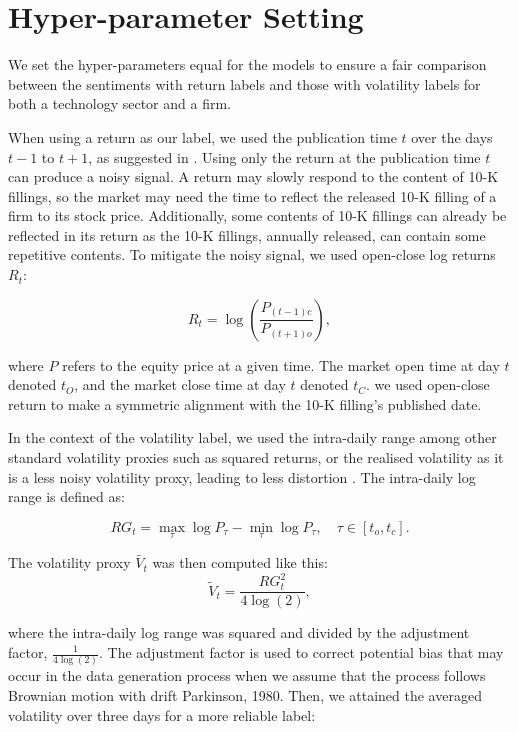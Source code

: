 \documentclass[logo,bsc,singlespacing,parskip]{infthesis}
\begin{document}
\section{Hyper-parameter Setting}
\label{sec:hyperparameter}
We set the hyper-parameters equal for the models to ensure a fair comparison between the sentiments with return labels and those with volatility labels for both a technology sector and a firm.

When using a return as our label, we used the publication time $t$ over the days $t - 1$ to $t +1$, as suggested in \cite{ke2020predicting}. Using only the return at the publication time $t$ can produce a noisy signal. A return may slowly respond to the content of 10-K fillings, so the market may need the time to reflect the released 10-K filling of a firm to its stock price. Additionally, some contents of 10-K fillings can already be reflected in its return as the 10-K fillings, annually released, can contain some repetitive contents. To mitigate the noisy signal, we used open-close log returns
$R_t$:

\begin{equation} \label{5.1}
R_t = \log\left(\frac{P_{(t-1)c}}{P_{(t+1)o}}\right),
\end{equation}

where $P$ refers to the equity price at a given time. The market open time at day $t$ denoted $t_O$, and the market close time at day $t$ denoted $t_C$. we used open-close return to make a symmetric alignment with the 10-K filling’s published date.

In the context of the volatility label, we used the intra-daily range among other standard volatility proxies such as squared returns, or the realised volatility as it is a less noisy volatility proxy, leading to less distortion \cite{alizadeh2002range, patton2011volatility}. The intra-daily log range is defined as:

\begin{equation} \label{5.2}
RG_t = \max_{\tau} \log P_{\tau} - \min_{\tau} \log P_{\tau}, \quad \tau \in [t_o,t_c].
\end{equation}

The volatility proxy $\tilde{V_t}$ was then computed like this:
\begin{equation} \label{5.3}
\tilde{V}_t = \frac{RG_t^2}{4\log(2)},
\end{equation}

where the intra-daily log range was squared and divided by the adjustment factor, $\frac{1}{4\log(2)}$. The adjustment factor is used to correct potential bias that may occur in the data generation process when we assume that the process follows Brownian motion with drift Parkinson, 1980. Then, we attained the averaged volatility over three days for a more reliable label:
\end{document}
